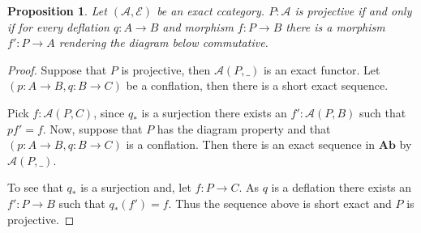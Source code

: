 \documentclass[12pt]{article}
\newtheorem{prop}[theorem]{Proposition}
\theoremstyle{definition}
\theoremstyle{remark}
\begin{document}
            \begin{prop}
                Let $(\mathcal{A},\mathcal{E})$ be an exact ccategory. $P:\mathcal{A}$ is projective if and only if for every deflation $q:A\rightarrow B$ and morphism $f:P\rightarrow B$  there is a morphism $f':P\rightarrow A$ rendering the diagram below commutative.
                \begin{center}
                \end{center}
            \end{prop}

            \begin{proof}
                Suppose that $P$ is projective, then $\mathcal{A}(P,\_)$ is an exact functor. Let $(p:A\rightarrow B,q:B\rightarrow C)$ be a conflation, then there is a short exact sequence.
                \begin{center}
                \end{center}
                Pick $f:\mathcal{A}(P,C)$, since $q_*$ is a surjection there exists an $f':\mathcal{A}(P,B)$ such that $pf'=f$.
                Now, suppose that $P$ has the diagram property and that $(p:A\rightarrow B,q:B\rightarrow C)$ is a conflation. Then there is an exact sequence in $\textbf{Ab}$ by $\mathcal{A}(P,\_)$.
                \begin{center}
                \end{center}
                To see that $q_*$ is a surjection and, let $f:P\rightarrow C$. As $q$ is a deflation there exists an $f':P\rightarrow B$ such that $q_*(f')=f$. Thus the sequence above is short exact and $P$ is projective. 
            \end{proof}
\end{document}
